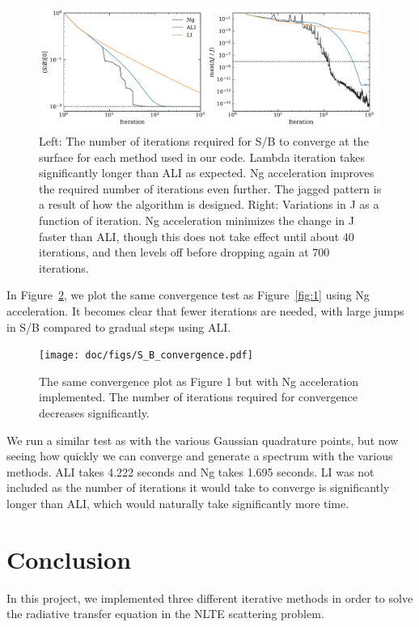 \documentclass[12pt]{article}
\begin{document}
\begin{figure}[ht]
 \centering
 \includegraphics[width=0.99\textwidth]{iterations.pdf}
 \caption{Left: The number of iterations required for S/B to converge at the surface for each method used in our code. Lambda iteration takes significantly longer than ALI as expected. Ng acceleration improves the required number of iterations even further. The jagged pattern is a result of how the algorithm is designed. Right: Variations in J as a function of iteration. Ng acceleration minimizes the change in J faster than ALI, though this does not take effect until about 40 iterations, and then levels off before dropping again at 700 iterations.}
  \label{fig:6}
\end{figure}

In Figure~\ref{fig:7}, we plot the same convergence test as Figure~\ref{fig:1} using Ng acceleration. It becomes clear that fewer iterations are needed, with large jumps in S/B compared to gradual steps using ALI.

\begin{figure}[ht]
 \centering
 \texttt{[image: doc/figs/S\_B\_convergence.pdf]}
 \caption{The same convergence plot as Figure 1 but with Ng acceleration implemented. The number of iterations required for convergence decreases significantly.}
  \label{fig:7}
\end{figure}

We run a similar test as with the various Gaussian quadrature points, but now seeing how quickly we can converge and generate a spectrum with the various methods. ALI takes 4.222 seconds and Ng takes 1.695 seconds. LI was not included as the number of iterations it would take to converge is significantly longer than ALI, which would naturally take significantly more time.  

\section{Conclusion}

In this project, we implemented three different iterative methods in order to solve the radiative transfer equation in the NLTE scattering problem.



\clearpage

\end{document}
